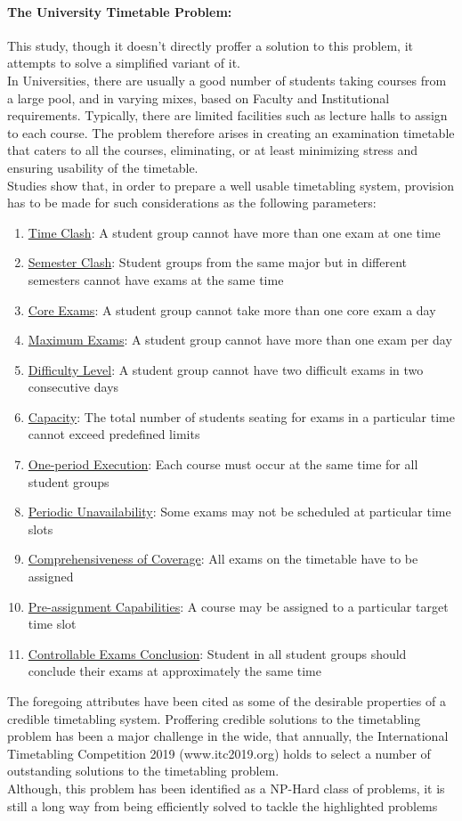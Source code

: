 \documentclass[a4paper]{book}
\begin{document}
			\paragraph{The University Timetable Problem:}
			This study, though it doesn't directly proffer a solution to this problem, it attempts to solve a simplified variant of it.
			\\In Universities, there are usually a good number of students taking courses from a large pool, and in varying mixes, based on Faculty and Institutional requirements. Typically, there are limited facilities such as lecture halls to assign to each course. The problem therefore arises in creating an examination timetable that caters to all the courses, eliminating, or at least minimizing stress and ensuring usability of the timetable.
			\\Studies show that, in order to prepare a well usable timetabling system, provision has to be made for such considerations as the following parameters:
			\begin{enumerate}
				\item \underline{Time Clash}: A student group cannot have more than one exam at one time
				\item \underline{Semester Clash}: Student groups from the same major but in different semesters cannot have exams at the same time
				\item \underline{Core Exams}: A student group cannot take more than one core exam a day
				\item \underline{Maximum Exams}: A student group cannot have more than one exam per day
				\item \underline{Difficulty Level}: A student group cannot have two difficult exams in two consecutive days
				\item \underline{Capacity}: The total number of students seating for exams in a particular time cannot exceed predefined limits
				\item \underline{One-period Execution}: Each course must occur at the same time for all student groups
				\item \underline{Periodic Unavailability}: Some exams may not be scheduled at particular time slots
				\item \underline{Comprehensiveness of Coverage}: All exams on the timetable have to be assigned
				\item \underline{Pre-assignment Capabilities}: A course may be assigned to a particular target time slot
				\item \underline{Controllable Exams Conclusion}: Student in all student groups should conclude their exams at approximately the same time
			\end{enumerate}
			The foregoing attributes have been cited as some of the desirable properties of a credible timetabling system. Proffering credible solutions to the timetabling problem has been a major challenge in the wide, that annually, the International Timetabling Competition 2019 (www.itc2019.org) holds to select a number of outstanding solutions to the timetabling problem.\\
			Although, this problem has been identified as a NP-Hard class of problems, it is still a long way from being efficiently solved to tackle the highlighted problems
\end{document}

